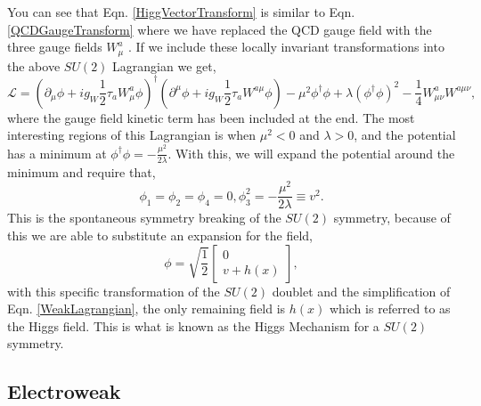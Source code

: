 You can see that Eqn. \ref{HiggVectorTransform} is similar to Eqn. \ref{QCDGaugeTransform} where we have replaced the QCD gauge field with the three gauge fields $W_\mu^a$ \cite{halzen_quarks_1984, griffiths_introduction_2008}. If we include these locally invariant transformations into the above $SU(2)$ Lagrangian we get,
\begin{equation}\label{WeakLagrangian}
\mathcal{L}=(\partial_\mu\phi+ig_W\frac{1}{2}\tau_{a}W^{a}_\mu\phi)^\dagger(\partial^\mu\phi+ig_W\frac{1}{2}\tau_{a}W^{a\mu}\phi)-\mu^2\phi^\dagger\phi+\lambda(\phi^\dagger\phi)^2-\frac{1}{4}W^{a}_{\mu\nu}W^{a\mu\nu},
\end{equation}
where the gauge field kinetic term has been included at the end\cite{halzen_quarks_1984, griffiths_introduction_2008}. The most interesting regions of this Lagrangian is when $\mu^2<0$ and $\lambda>0$, and the potential has a minimum at $\phi^\dagger\phi=-\frac{\mu^2}{2\lambda}$. With this, we will expand the potential around the minimum and require that,
\begin{equation}
\phi_1=\phi_2=\phi_4=0, \phi_3^2=-\frac{\mu^2}{2\lambda}\equiv v^2.
\end{equation}
This is the spontaneous symmetry breaking of the $SU(2)$ symmetry, because of this we are able to substitute an expansion for the field,
\begin{equation}
\phi=\sqrt{\frac{1}{2}}
\begin{bmatrix}
0 \\
v+h(x)
\end{bmatrix},
\end{equation}
with this specific transformation of the $SU(2)$ doublet and the simplification of Eqn. \ref{WeakLagrangian}, the only remaining field is $h(x)$ which is referred to as the Higgs field. This is what is known as the Higgs Mechanism for a $SU(2)$ symmetry. 

\subsection{Electroweak} \label{EMWeak}

